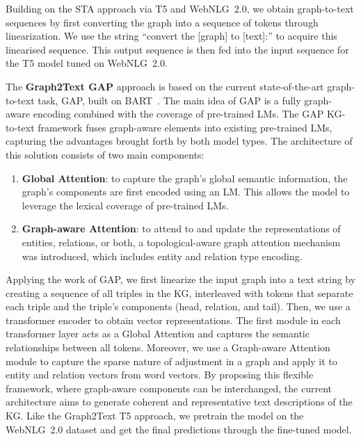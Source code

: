 Building on the STA approach via T5 and WebNLG~2.0, we obtain graph-to-text sequences by first converting the graph into a sequence of tokens through linearization. We use the string ``convert the [graph] to [text]:'' to acquire this linearised sequence. This output sequence is then fed into the input sequence for the T5 model tuned on WebNLG~2.0. 

The \textbf{Graph2Text GAP} approach is based on the current state-of-the-art graph-to-text task, GAP, built on BART~\cite{DBLP:conf/coling/ColasAW22-GAP}. 
The main idea of GAP is a fully graph-aware encoding combined with the coverage of pre-trained LMs. The GAP KG-to-text framework fuses graph-aware elements into existing pre-trained LMs, capturing the advantages brought forth by both model types. The architecture of this solution consists of two main components:

\begin{enumerate}
\item \textbf{Global Attention}: to capture the graph's global semantic information, the graph's components are first encoded using an LM. This allows the model to leverage the lexical coverage of pre-trained LMs.
\item \textbf{Graph-aware Attention}: to attend to and update the representations of entities, relations, or both, a topological-aware graph attention mechanism was introduced, which includes entity and relation type encoding.
\end{enumerate}

Applying the work of GAP, we first linearize the input graph into a text string by creating a sequence of all triples in the KG, interleaved with tokens that separate each triple and the triple's components (head, relation, and tail). Then, we use a transformer encoder to obtain vector representations. The first module in each transformer layer acts as a Global Attention and captures the semantic relationships between all tokens. Moreover, we use a Graph-aware Attention module to capture the sparse nature of adjustment in a graph and apply it to entity and relation vectors from word vectors. By proposing this flexible framework, where graph-aware components can be interchanged, the current architecture aims to generate coherent and representative text descriptions of the KG. Like the Graph2Text T5 approach, we pretrain the model on the WebNLG~2.0 dataset and get the final predictions through the fine-tuned model. 

